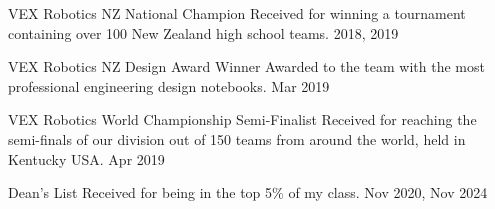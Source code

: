 
\begin{cvhonors}
	\cvhonor
	{VEX Robotics NZ National Champion}
	{Received for winning a tournament containing over 100 New Zealand high school teams.}
	{}
	{2018, 2019}

	\cvhonor
	{VEX Robotics NZ Design Award Winner}
	{Awarded to the team with the most professional engineering design notebooks.}
	{}
	{Mar 2019}

	\cvhonor
	{VEX Robotics World Championship Semi-Finalist}
	{Received for reaching the semi-finals of our division out of 150 teams from around the world, held in Kentucky USA.}
	{}
	{Apr 2019}

	\cvhonor
	{Dean's List}
	{Received for being in the top 5\% of my class.}
	{}
	{Nov 2020, Nov 2024}
\end{cvhonors}
